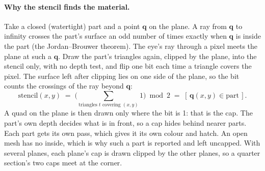 \paragraph{Why the stencil finds the material.} Take a closed (watertight) part and a point $\mathbf q$ on the plane.
A ray from $\mathbf q$ to infinity crosses the part's surface an odd number of times exactly when $\mathbf q$ is
inside the part (the Jordan--Brouwer theorem). The eye's ray through a pixel meets the plane at such a $\mathbf q$.
Draw the part's triangles again, clipped by the plane, into the stencil only, with no depth test, and flip one bit
each time a triangle covers the pixel. The surface left after clipping lies on one side of the plane, so the bit
counts the crossings of the ray beyond $\mathbf q$:
\[
  \text{stencil}(x,y) \;=\; \Big(\textstyle\sum_{\text{triangles } t \text{ covering } (x,y)} 1\Big)\bmod 2
  \;=\; [\,\mathbf q(x,y)\in\text{part}\,].
\]
A quad on the plane is then drawn only where the bit is 1: that is the cap. The part's own depth decides what is in
front, so a cap hides behind nearer parts. Each part gets its own pass, which gives it its own colour and hatch. An
open mesh has no inside, which is why such a part is reported and left uncapped. With several planes, each plane's
cap is drawn clipped by the other planes, so a quarter section's two caps meet at the corner.

